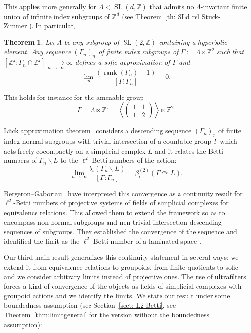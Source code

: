 \documentclass[10pt]{amsart}
\newtheorem{theo}[cdrthm]{Theorem}
\theoremstyle{definition}
\newcommand{\Zmath}{\mathbb{Z}}
\newcommand{\acting}{\curvearrowright}
\DeclareMathOperator{\rank}{rank}
\DeclareMathOperator{\SL}{SL}
\begin{document}
This applies more generally for $\Lambda<\SL(d,\Zmath)$ that admits no $\Lambda$-invariant finite union of infinite index subgroups of $\Zmath^d$ (see Theorem~\ref{th: SLd rel Stuck-Zimmer}). In particular,
\begin{theo}\label{th: intro SL2 rel Stuck-Zimmer}
Let $\Lambda$ be any subgroup of $\SL(2,\Zmath)$ containing a hyperbolic element. Any sequence $(\Gamma_n)_n$ of finite index subgroups of $\Gamma:=\Lambda\ltimes \Zmath^2$ such that $[\Zmath^2:\Gamma_n\cap \Zmath^2]\underset{n\,\to\,\infty}{\longrightarrow}\infty$ defines a sofic approximation of $\Gamma$ and
\begin{equation}
\lim_{n} \frac{\left(\rank (\Gamma_n)-1\right)}{ [\Gamma:\Gamma_n]}=0.
\end{equation}
\end{theo}

This holds for instance for the amenable group
\[
\Gamma=\Lambda\ltimes \Zmath^2=\left\langle
\begin{pmatrix} 1 & 1 \\ 1 & 2
\end{pmatrix} \right \rangle \ltimes \Zmath^2.
\]



L\"uck approximation theorem~\cite{Luc94b} considers a descending sequence $(\Gamma_n)_n$ of finite index normal subgroups with trivial intersection of a countable group $\Gamma$ which acts freely cocompactly on a simplicial complex $L$ and it relates the Betti numbers of $\Gamma_n\backslash L$ to the $\ell^2$-Betti numbers of the action:
\begin{equation}
\lim_{n\to \infty} \frac{b_i(\Gamma_n\backslash L)}{[\Gamma:\Gamma_n]}=\beta^{(2)}_{i}(\Gamma\acting L).
\end{equation}



Bergeron--Gaboriau~\cite{berggab} have interpreted this convergence as a continuity result for $\ell^2$-Betti numbers of projective systems of fields of simplicial complexes for equivalence relations. This allowed them to extend the framework so as to encompass non-normal subgroups and non trivial intersection descending sequences of subgroups. They established the convergence of the sequence and identified the limit as the $\ell^2$-Betti number of a laminated space~\cite[Théorème~0.2, Théorème~3.1]{berggab}.

Our third main result generalizes this continuity statement in several ways: we extend it from equivalence relations to groupoids, from finite quotients to sofic and we consider arbitrary limits instead of projective ones. The use of ultrafilters forces a kind of convergence of the objects as fields of simplicial complexes with groupoid actions and we identify the limits. We state our result under some boundedness assumption (see Section~\ref{sect: L2 Betti}, see Theorem~\ref{thm:limitgeneral} for the version without the boundedness assumption):
\end{document}
